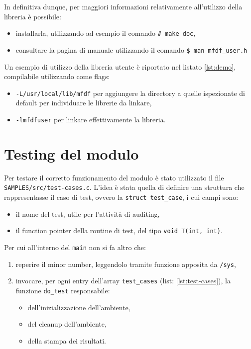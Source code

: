 \documentclass{article}
\newcommand{\terminal}[1]{\colorbox{tn-bg}{\textcolor{tn-fg}{\texttt{#1}}}}
\begin{document}
In definitiva dunque, per maggiori informazioni relativamente all'utilizzo della libreria è possibile:
\begin{itemize}
        \item installarla, utilizzando ad esempio il comando \terminal{\# make doc},
        \item consultare la pagina di manuale utilizzando il comando \terminal{\$ man mfdf\_user.h}
\end{itemize}

Un esempio di utilizzo della libreria utente è riportato nel listato \ref{lst:demo}, compilabile utilizzando come flags:
\begin{itemize}
        \item \texttt{-L/usr/local/lib/mfdf} per aggiungere la directory a quelle ispezionate di default per individuare le librerie da linkare,
        \item \texttt{-lmfdfuser} per linkare effettivamente la libreria.
\end{itemize}

\section{Testing del modulo}
Per testare il corretto funzionamento del modulo è stato utilizzato il file \texttt{SAMPLES/src/test-cases.c}. L'idea è stata quella di definire una struttura che rappresentasse il caso di test, ovvero la \texttt{struct test\_case}, i cui campi sono:
\begin{itemize}
        \item il nome del test, utile per l'attività di auditing,
        \item il function pointer della routine di test, del tipo \texttt{void T(int, int)}.
\end{itemize}

Per cui all'interno del \texttt{main} non si fa altro che:
\begin{enumerate}
        \item reperire il minor number, leggendolo tramite funzione apposita da \texttt{/sys},
        \item invocare, per ogni entry dell'array \texttt{test\_cases} (list: \ref{lst:test-cases}), la funzione \texttt{do\_test} responsabile:
                \begin{itemize}
                        \item dell'inizializzazione dell'ambiente,
                        \item del cleanup dell'ambiente,
                        \item della stampa dei risultati.
                \end{itemize}
\end{enumerate}
\end{document}
